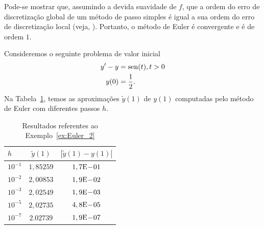 \begin{obs}
  Pode-se mostrar que, assumindo a devida suavidade de $f$, que a ordem do erro de discretização global de um método de passo simples é igual a sua ordem do erro de discretização local (veja, \cite[Cap. 7, Seç. 7.2]{Stoer1993a}). Portanto, o método de Euler é convergente e é de ordem $1$.
\end{obs}

\begin{ex}\label{ex:Euler_2}
  Consideremos o seguinte problema de valor inicial
  \begin{align}
    y' - y &= \operatorname{sen}(t), t>0\label{eq:Euler_aux2}\\
    y(0) &= \frac{1}{2}.
  \end{align}
  Na Tabela~\ref{tab:ex_Euler_2}, temos as aproximações $\tilde{y}(1)$ de $y(1)$ computadas pelo método de Euler com diferentes passos $h$.
 
  \begin{table}[h!]
    \centering
    \begin{tabular}{l|cc}
      $h$ & $\tilde{y}(1)$ & $|\tilde{y}(1)-y(1)|$\\\hline
      $10^{-1}$ & $1,85259$ & $1,7\mathrm{E}\!-\!01$ \\
      $10^{-2}$ & $2,00853$ & $1,9\mathrm{E}\!-\!02$ \\
      $10^{-3}$ & $2,02549$ & $1,9\mathrm{E}\!-\!03$ \\
      $10^{-5}$ & $2,02735$ & $4,8\mathrm{E}\!-\!05$ \\
      $10^{-7}$ & $2.02739$ & $1,9\mathrm{E}\!-\!07$ \\\hline
    \end{tabular}
    \caption{Resultados referentes ao Exemplo~\ref{ex:Euler_2}}
    \label{tab:ex_Euler_2}
  \end{table}





\end{ex}

